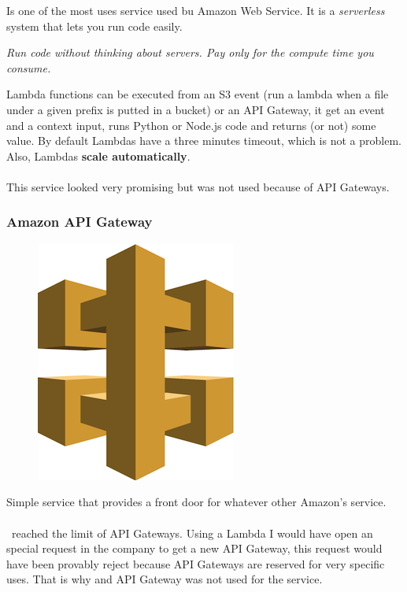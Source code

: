 Is one of the most uses service used bu Amazon Web Service. It is a \textit{serverless} system that lets you run code easily.

\begin{displayquote}
\textit{Run code without thinking about servers. Pay only for the compute time you consume.}
\end{displayquote}

Lambda functions can be executed from an S3 event (run a lambda when a file under a given prefix is putted in a bucket) or an API Gateway, it get an event and a context input, runs Python\cite{python} or Node.js\cite{nodejs} code and returns (or not) some value. By default Lambdas have a three minutes timeout, which is not a problem. Also, Lambdas \textbf{scale automatically}.
\\\\
This service looked very promising but was not used because of API Gateways.

\subsubsection{Amazon API Gateway}

\begin{figure}[H]
\includegraphics[scale=0.2]{resources/api-logo.png}
\end{figure}

Simple service that provides a front door for whatever other Amazon's service.
\\\\
\company\ reached the limit of API Gateways. Using a Lambda I would have open an special request in the company to get a new API Gateway, this request would have been provably reject because API Gateways are reserved for very specific uses. That is why  and API Gateway was not used for the service.

